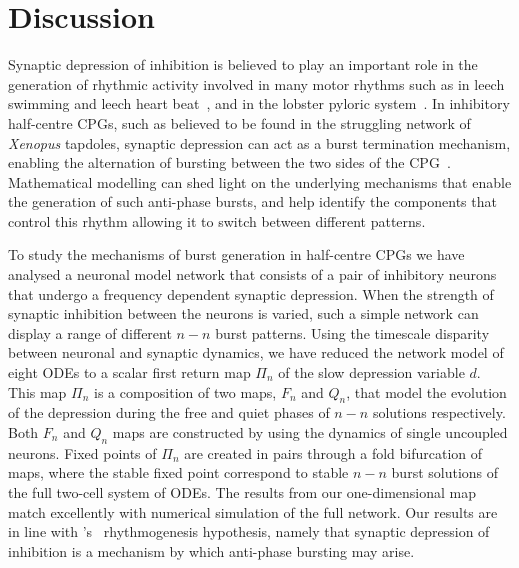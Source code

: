 \section{Discussion}
Synaptic depression of inhibition is believed to play an important role in the generation of rhythmic activity involved in many motor rhythms such as in leech swimming \citep{mangan1994} and leech heart beat~\citep{calabrese1995}, and in the lobster pyloric system~\citep{manor1997, rabbah2007}. In inhibitory half-centre CPGs, such as believed to be found in the struggling network of \textit{Xenopus} tapdoles,  synaptic depression can act as a burst termination mechanism, enabling the alternation of bursting between the two sides of the CPG~\citep{li2007}. Mathematical modelling can shed light on the underlying mechanisms that enable the generation of such anti-phase bursts, and help identify the components that control this rhythm allowing it to switch between different patterns.

To study the mechanisms of burst generation in half-centre CPGs we have analysed a neuronal model network that consists of a pair of inhibitory neurons that undergo a frequency dependent synaptic depression. When the strength of synaptic inhibition between the neurons is varied, such a simple network can display a range of different \(n-n\) burst patterns. Using the timescale disparity between neuronal and synaptic dynamics, we have reduced the network model of eight ODEs to a scalar first return map \(\Pi_n\) of the slow depression variable \(d\). This map \(\Pi_n\) is a composition of two maps, \(F_n\) and \(Q_n\), that model the evolution of the depression during the free and quiet phases of \(n-n\) solutions respectively. Both \(F_n\) and \(Q_n\) maps are constructed by using the dynamics of single uncoupled neurons. Fixed points of \(\Pi_n\) are created in pairs through a fold bifurcation of maps, where the stable fixed point correspond to stable \(n-n\) burst solutions of the full two-cell system of ODEs. The results from our one-dimensional map match excellently with numerical simulation of the full network. Our results are in line with \citeauthor{brown1911}'s~\citeyear{brown1911} rhythmogenesis hypothesis, namely that synaptic depression of inhibition is a mechanism by which anti-phase bursting may arise.

